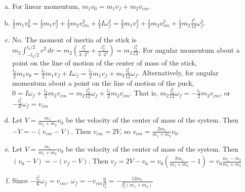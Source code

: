 \documentclass{esg8012pset}
\renewcommand{\d}{\,d}
\begin{document}
\begin{solution}
  \begin{enumerate}[(a)]
    \item For linear momentum, $m_1 v_0 = m_1 v_f + m_2 v_{cm}$.
    \item $\frac{1}{2}m_1v_0^2 = \frac{1}{2} m_1 v_f^2 + \frac{1}{2}m_2 v_{cm}^2 + \frac{1}{2} I \omega_f^2 = \frac{1}{2} m_1 v_f^2 + \frac{1}{2}m_2 v_{cm}^2 + \frac{1}{2} m_2 \frac{l^3}{12} \omega_f^2$.
    \item No. The moment of inertia of the stick is $m_2\int_{-l_2/2}^{l_2/2} r^2 \d r = m_2\left(\frac{l_2^3}{3\cdot 2^3} + \frac{l_2^3}{3\cdot 2^3}\right) = m_2 \frac{l_2^3}{12}$.  For angular momentum about a point on the line of motion of the center of mass of the stick, $\frac{l_2}{2} m_1 v_0 = \frac{l_2}{2} m_1 v_f + I\omega_f = \frac{l_2}{2} m_1 v_f + m_2 \frac{l_2^3}{12}\omega_f$.  Alternatively, for angular momentum about a point on the line of motion of the puck, $0 = I\omega_f + \frac{l_2}{2} m_2 v_{cm} = m_2 \frac{l_2^3}{12}\omega_f + \frac{l_2}{2} m_2 v_{cm}$.  That is, $m_2 \frac{l_2^3}{12}\omega_f = -\frac{l_2}{2} m_2 v_{cm}$, or $-\frac{l_2^2}{6}\omega_f = v_{cm}$
    \item Let $V = \frac{m_1}{m_1 + m_2}v_0$ be the velocity of the center of mass of the system.  Then $-V = -(v_{cm} - V)$.  Then $v_{cm} = 2V$, so $v_{cm} = \frac{2m_1}{m_1 + m_2}v_0$.
    \item Let $V = \frac{m_1}{m_1 + m_2}v_0$ be the velocity of the center of mass of the system.  Then $(v_0 - V) = -(v_f - V)$.  Then $v_f = 2V-v_0 = v_0\left(\frac{2m_1}{m_1 + m_2} - 1\right) = v_0\frac{m_1 - m_2}{m_1 + m_2}$
    \item Since $-\frac{l_2^2}{6}\omega_f = v_{cm}$, $\omega_f = -v_{cm}\frac{6}{l_2^2} = -\frac{12m_1}{l_2^2(m_1 + m_2)}$
  \end{enumerate}
\end{solution}
\end{document}
